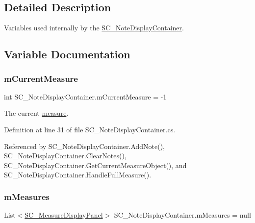 \subsection{Detailed Description}
Variables used internally by the \hyperlink{class_s_c___note_display_container}{S\+C\+\_\+\+Note\+Display\+Container}. 

\subsection{Variable Documentation}
\mbox{\label{group___s_c___n_d_c_priv_var_ga28ce2bf8358c9f686b5b9e362aa96dff}} 
\subsubsection{\texorpdfstring{m\+Current\+Measure}{mCurrentMeasure}}
{\footnotesize\ttfamily int S\+C\+\_\+\+Note\+Display\+Container.\+m\+Current\+Measure = -\/1\hspace{0.3cm}{\ttfamily [private]}}



The current \hyperlink{group___doc_s_c___m_d_p}{measure}. 



Definition at line 31 of file S\+C\+\_\+\+Note\+Display\+Container.\+cs.



Referenced by S\+C\+\_\+\+Note\+Display\+Container.\+Add\+Note(), S\+C\+\_\+\+Note\+Display\+Container.\+Clear\+Notes(), S\+C\+\_\+\+Note\+Display\+Container.\+Get\+Current\+Measure\+Object(), and S\+C\+\_\+\+Note\+Display\+Container.\+Handle\+Full\+Measure().

\mbox{\label{group___s_c___n_d_c_priv_var_gaa072fb53f6bd6646bc85f2ebc2a02229}} 
\subsubsection{\texorpdfstring{m\+Measures}{mMeasures}}
{\footnotesize\ttfamily List$<$\hyperlink{class_s_c___measure_display_panel}{S\+C\+\_\+\+Measure\+Display\+Panel}$>$ S\+C\+\_\+\+Note\+Display\+Container.\+m\+Measures = null\hspace{0.3cm}{\ttfamily [private]}}



